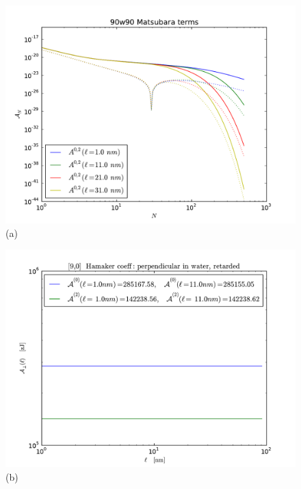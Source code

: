 \documentclass[onecolumn,letterpaper,amsmath,amssymb,floatfix,aps,superscriptaddress]{revtex4}
\begin{document}
\begin{figure}[t!]
\begin{center}
\begin{minipage}[b]{0.40\textwidth}
\begin{center}
\includegraphics[width=1.2\textwidth]{plots/90_A_vs_n.pdf} (a)
\end{center}
\end{minipage}
\hskip 43pt
\begin{minipage}[b]{0.40\textwidth}
\begin{center}
\includegraphics[width=1.2\textwidth]{plots/140322_90w90_HCs_perpendicular_ret.pdf} (b)
\end{center}

\end{minipage}
\end{center}
\end{figure}
\end{document}
